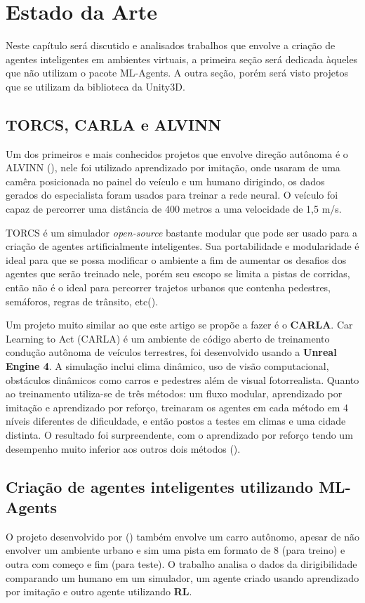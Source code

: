 \chapter{Estado da Arte}\label{cap:estArte}
Neste capítulo será discutido e analisados trabalhos que envolve a criação de agentes inteligentes em ambientes virtuais, a primeira seção será dedicada àqueles que não utilizam o pacote ML-Agents. A outra seção, porém será visto projetos que se utilizam da biblioteca da Unity3D.

\section*{TORCS, CARLA e ALVINN}
Um dos primeiros e mais conhecidos projetos que envolve direção autônoma é o ALVINN (), nele foi utilizado aprendizado por imitação, onde usaram de uma camêra posicionada no painel do veículo e um humano dirigindo, os dados gerados do especialista foram usados para treinar a rede neural. O veículo foi capaz de percorrer uma distância de 400 metros a uma velocidade de 1,5 m/s. 

TORCS é um simulador \textit{open-source} bastante modular que pode ser usado para a criação de agentes artificialmente inteligentes. Sua portabilidade e modularidade é ideal para que se possa modificar o ambiente a fim de aumentar os desafios dos agentes que serão treinado nele, porém seu escopo se limita a pistas de corridas, então não é o ideal para percorrer trajetos urbanos que contenha pedestres, semáforos, regras de trânsito, etc().

Um projeto muito similar ao que este artigo se propõe a fazer é o \textbf{CARLA}. Car Learning to Act (CARLA) é um ambiente de código aberto de treinamento condução autônoma de veículos terrestres, foi desenvolvido usando a \textbf{Unreal Engine 4}. A simulação inclui clima dinâmico, uso de visão computacional, obstáculos dinâmicos como carros e pedestres além de visual fotorrealista. Quanto ao treinamento utiliza-se de três métodos: um fluxo modular, aprendizado por imitação e aprendizado por reforço, treinaram os agentes em cada método em 4 níveis diferentes de dificuldade, e então postos a testes em climas e uma cidade distinta. O resultado foi surpreendente, com o aprendizado por reforço tendo um desempenho muito inferior aos outros dois métodos ().

\section*{Criação de agentes inteligentes utilizando ML-Agents}\label{sec:primTrab}
O projeto desenvolvido por () também envolve um carro autônomo, apesar de não envolver um ambiente urbano e sim uma pista em formato de 8 (para treino) e outra com começo e fim (para teste). O trabalho analisa o dados da dirigibilidade comparando um humano em um simulador, um agente criado usando aprendizado por imitação e outro agente utilizando \textbf{RL}. 


